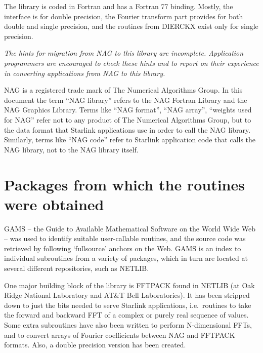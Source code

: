 \documentclass[11pt,twoside]{article}
\newcommand{\htmladdnormallink}[2]{#1}
\newcommand{\xlabel}[1]{}
\begin{document}
   The library is coded in Fortran and has a Fortran 77 binding. Mostly,
   the interface is for double precision, the Fourier transform part
   provides for both double and single precision, and the routines from
   DIERCKX exist only for single precision.

{\em 
   The hints for migration from NAG to this library are incomplete.
   Application programmers are encouraged to check these hints and to
   report on their experience in converting applications from NAG to
   this library.

   NAG is a registered trade mark of The Numerical Algorithms Group. In
   this document the term ``NAG library'' refers to the
\htmladdnormallink{NAG Fortran Library}{http://www.nag.co.uk/1h/numeric/FLOLCH}
   and the
\htmladdnormallink{NAG Graphics Library.}{http://www.nag.co.uk/1h/visual/GLGICH}
   Terms like ``NAG format'', ``NAG array'', ``weights used for NAG''
   refer not to any product of The Numerical Algorithms Group, but to
   the data format that Starlink applications use in order to call the
   NAG library. Similarly, terms like ``NAG code'' refer to Starlink
   application code that calls the NAG library, not to the NAG library
   itself.
\/}


\section{\xlabel{packages_from_which_the_routines_were_obtained}Packages from which the routines were obtained}

   GAMS -- the
\htmladdnormallink{Guide to Available Mathematical Software}
{http://gams.nist.gov/}
   on the World Wide Web -- was used to identify suitable user-callable
   routines, and the source code was retrieved by following `fullsource'
   anchors on the Web. GAMS is an index to individual subroutines from a
   variety of packages, which in turn are located at several different
   repositories, such as NETLIB.

   One major building block of the library is FFTPACK found in NETLIB (at
   Oak Ridge National Laboratory and AT\&T Bell Laboratories).
   It has been stripped down to just the bits needed to serve Starlink
   applications, i.e.\ routines to take the forward and backward FFT
   of a complex or purely real sequence of values. Some extra
   subroutines have also been written to perform N-dimensional FFTs, and
   to convert arrays of Fourier coefficients between NAG and FFTPACK
   formats. Also, a double precision version has been created.
\end{document}
